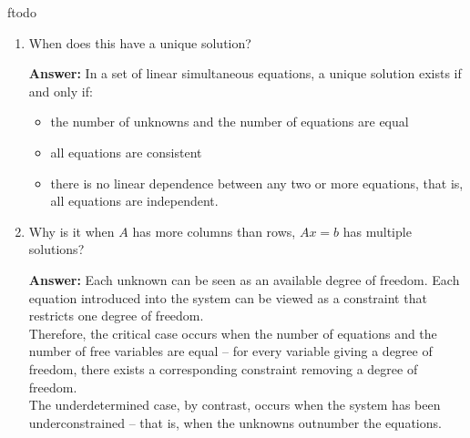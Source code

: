 ƒtodo\documentclass{article}
\newenvironment{QandA}{\begin{enumerate}[label=\arabic*.]}{\end{enumerate}}
\newenvironment{InnerQandA}{\begin{enumerate}[label=\roman*.]}{\end{enumerate}}
\newenvironment{answer}{\par\normalfont \textbf{Answer:}}{}
\begin{document}
\begin{QandA}
\begin{InnerQandA}
        \item When does this have a unique solution?
        \begin{answer}
            In a set of linear simultaneous equations, a unique solution exists if and only if: 
            \begin{itemize}
                \item the number of unknowns and the number of equations are equal
                \item all equations are consistent
                \item there is no linear dependence between any two or more equations, that is, all equations are independent.
            \end{itemize}
        \end{answer}
        
        \item Why is it when $A$ has more columns than rows,  $Ax=b$ has multiple solutions?
        \begin{answer}
            Each unknown can be seen as an available degree of freedom. Each equation introduced into the system can be viewed as a constraint that restricts one degree of freedom. \\
            Therefore, the critical case occurs when the number of equations and the number of free variables are equal -- for every variable giving a degree of freedom, there exists a corresponding constraint removing a degree of freedom. \\
            The underdetermined case, by contrast, occurs when the system has been underconstrained  -- that is, when the unknowns outnumber the equations.
        \end{answer}
        

\end{InnerQandA}
\end{QandA}
\end{document}
